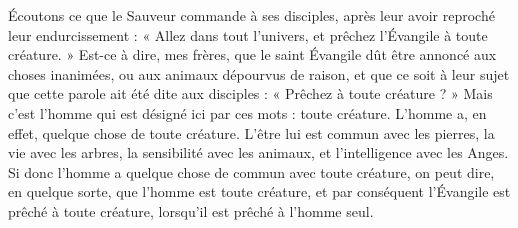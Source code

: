 Écoutons ce que le Sauveur commande à ses disciples, après leur avoir reproché leur endurcissement : « Allez dans tout l’univers, et prêchez l’Évangile à toute créature. » Est-ce à dire, mes frères, que le saint Évangile dût être annoncé aux choses inanimées, ou aux animaux dépourvus de raison, et que ce soit à leur sujet que cette parole ait été dite aux disciples : « Prêchez à toute créature ? » Mais c’est l’homme qui est désigné ici par ces mots : toute créature. L’homme a, en effet, quelque chose de toute créature. L’être lui est commun avec les pierres, la vie avec les arbres, la sensibilité avec les animaux, et l’intelligence avec les Anges. Si donc l’homme a quelque chose de commun avec toute créature, on peut dire, en quelque sorte, que l’homme est toute créature, et par conséquent l’Évangile est prêché à toute créature, lorsqu’il est prêché à l’homme seul.